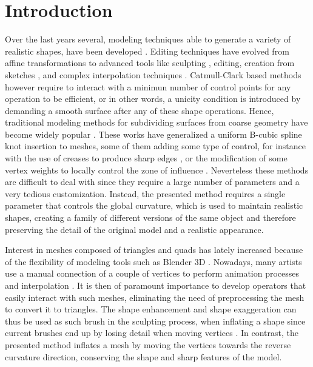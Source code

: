 \documentclass[10pt, conference]{IEEEtran}
\begin{document}
\IEEEpeerreviewmaketitle

\section{Introduction}
%
Over the last years several, modeling techniques able to generate
a variety of realistic shapes, have been developed \cite{Botsch2006}.
Editing techniques have evolved from affine transformations to advanced
tools like sculpting \cite{Coquillart1990,Galyean1991,Stanculescu2011},
editing, creation from sketches \cite{Igarashi1999,Gonen2012}, and
complex interpolation techniques \cite{Sorkine2004,Zhou2005}. Catmull-Clark
based methods however require to interact with a minimun number of
control points for any operation to be efficient, or in other words,
a unicity condition is introduced by demanding a smooth surface after
any of these shape operations. Hence, traditional modeling methods
for subdividing surfaces from coarse geometry have become widely popular
\cite{Catmull1978,Stam1998}. These works have generalized a uniform
B-cubic spline knot insertion to meshes, some of them adding some
type of control, for instance with the use of creases to produce sharp
edges \cite{DeRose1998}, or the modification of some vertex weights
to locally control the zone of influence \cite{Biermann2000}. Neverteless
these methods are difficult to deal with since they require a large
number of parameters and a very tedious customization. Instead, the
presented method requires a single parameter that controls the global
curvature, which is used to maintain realistic shapes, creating a
family of different versions of the same object and therefore preserving
the detail of the original model and a realistic appearance. 

Interest in meshes composed of triangles and quads has lately increased
because of the flexibility of modeling tools such as Blender 3D \cite{blender}.
Nowadays, many artists use a manual connection of a couple of vertices
to perform animation processes and interpolation \cite{Mullen2007}.
It is then of paramount importance to develop operators that easily
interact with such meshes, eliminating the need of preprocessing the
mesh to convert it to triangles. The shape enhancement and shape exaggeration
can thus be used as such brush in the sculpting process, when inflating
a shape since current brushes end up by losing detail when moving
vertices \cite{Stanculescu2011}. In contrast, the presented method
inflates a mesh by moving the vertices towards the reverse curvature
direction, conserving the shape and sharp features of the model.
\end{document}
